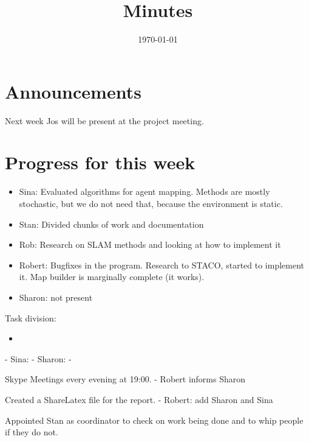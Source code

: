 \documentclass{article}
\title{Minutes}
\date{\today}
\begin{document}
\section{Announcements}
	Next week Jos will be present at the project meeting.

\section{Progress for this week}
\begin{itemize}
	\item Sina: Evaluated algorithms for agent mapping. Methods are mostly stochastic, but we do not need that, because the environment is static.
	\item Stan: Divided chunks of work and documentation
	\item Rob: Research on SLAM methods and looking at how to implement it
	\item Robert: Bugfixes in the program. Research to STACO, started to implement it. Map builder is marginally complete (it works).
	\item Sharon: not present
\end{itemize}

Task division:
\begin{itemize}
	\item 
\end{itemize}
	- Sina: 
	- Sharon:
	- 

Skype Meetings every evening at 19:00.
	- Robert informs Sharon

Created a ShareLatex file for the report.
	- Robert: add Sharon and Sina

Appointed Stan as coordinator to check on work being done and to whip people if they do not.
\end{document}
